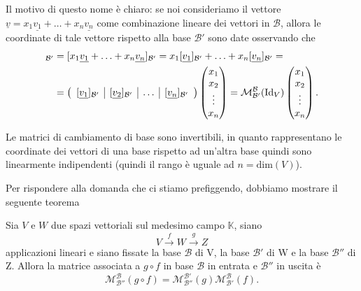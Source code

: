 Il motivo di questo nome è chiaro: se noi consideriamo il vettore $\underline{v} = x_1 \underline{v_1} + \ldots + x_n \underline{v_n}$ come combinazione lineare dei vettori in $\mathcal{B}$, allora le coordinate di tale vettore rispetto alla base $\mathcal{B}'$ sono date osservando che
\begin{align}
  [\underline{v}]_{\mathcal{B}'} &= [x_1 \underline{v_1} + \ldots + x_n \underline{v_n}]_\mathcal{B'} = x_1 [\underline{v_1}]_\mathcal{B'} + \ldots + x_n [\underline{v_n}]_\mathcal{B'} = \\
  &=\left( \begin{array}{c | c | c | c}
    [\underline{v_1}]_{\mathcal{B'}} & [\underline{v_2}]_\mathcal{B'} & \ldots & [\underline{v_n}]_\mathcal{B'}
  \end{array} \right) \begin{pmatrix}
    x_1 \\
    x_2 \\
    \vdots \\
    x_n
  \end{pmatrix} = \mathcal{M}^\mathcal{B}_{\mathcal{B}'}(\text{Id}_V) \begin{pmatrix}
    x_1 \\
    x_2 \\
    \vdots \\
    x_n
  \end{pmatrix}.
\end{align}
\begin{remark}
  Le matrici di cambiamento di base sono invertibili, in quanto rappresentano le coordinate dei vettori di una base rispetto ad un'altra base quindi sono linearmente indipendenti (quindi il rango è uguale ad $n = \text{dim}(V)$).
\end{remark}
Per rispondere alla domanda che ci stiamo prefiggendo, dobbiamo mostrare il seguente teorema 
\begin{theorem}
  \label{thm:comp_matr}
  Sia $V$ e $W$ due spazi vettoriali sul medesimo campo $\mathbb{K}$, siano
  $$
    V \stackrel{f}{\to} W \stackrel{g}{\to} Z
  $$
  applicazioni lineari e siano fissate la base $\mathcal{B}$ di V, la base $\mathcal{B}'$ di W e la base $\mathcal{B}''$ di Z. Allora la matrice associata a $g \circ f$ in base $\mathcal{B}$ in entrata e $\mathcal{B}''$ in uscita è
  $$
    \mathcal{M}^\mathcal{B}_\mathcal{B''}(g \circ f) = \mathcal{M}^\mathcal{B'}_\mathcal{B''}(g) \mathcal{M}^\mathcal{B}_\mathcal{B'}(f).
  $$
\end{theorem}
